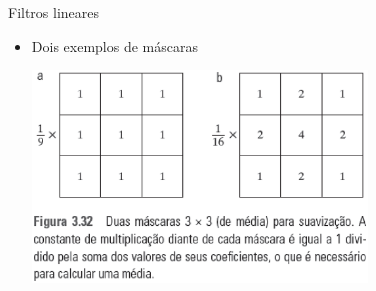       \begin{slide}[toc=]{Filtros lineares}
      \begin{itemize}
       \item Dois exemplos de máscaras
       \begin{center}
          \includegraphics[width=0.7\textwidth]{figs/fig0332}
      \end{center}
      \end{itemize}
      \end{slide}
      
